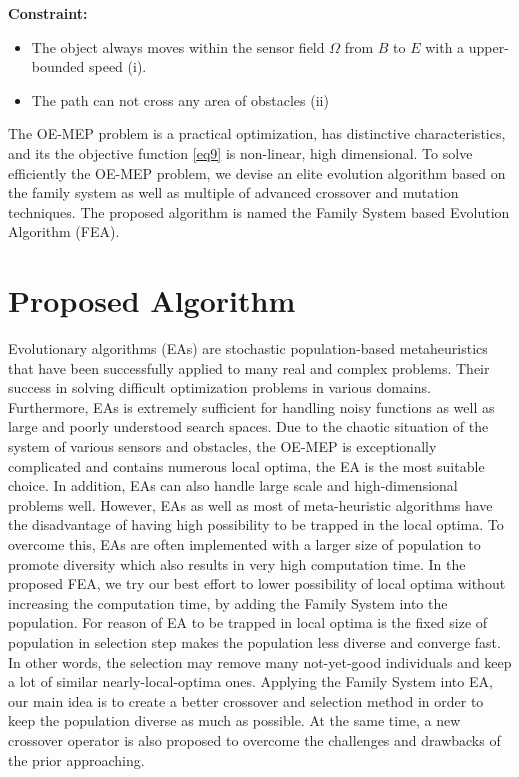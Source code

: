 \documentclass[final]{elsarticle}
\begin{document}
\textbf{Constraint:}	
\begin{itemize}
	\item The object always moves within the sensor field $\Omega $ from $B$ to $E$ with a upper-bounded speed (i).
	\item The path can not cross any area of obstacles  (ii)
\end{itemize}
	
The OE-MEP problem is a practical optimization, has distinctive characteristics, and its the objective function \eqref{eq9} is non-linear, high dimensional. To solve efficiently the OE-MEP problem, we devise an elite evolution algorithm based on the family system as well as multiple of advanced crossover and mutation techniques. The proposed algorithm is named the Family System based Evolution Algorithm (FEA).

\section{Proposed Algorithm}
Evolutionary algorithms (EAs) are stochastic population-based metaheuristics that have been successfully applied to many real and complex problems. Their success in solving difficult optimization problems in various domains. Furthermore, EAs is extremely sufficient for handling noisy functions as well as large and poorly understood search spaces. Due to the chaotic situation of the system of various sensors and obstacles, the OE-MEP is exceptionally complicated and contains numerous local optima, the EA is the most suitable choice. In addition, EAs can also handle large scale and high-dimensional problems well. However, EAs as well as most of meta-heuristic algorithms have the disadvantage of having high possibility to be trapped in the local optima. To overcome this, EAs are often implemented with a larger size of population to promote diversity which also results in very high computation time. In the proposed FEA, we try our best effort to lower possibility of local optima without increasing the computation time, by adding the Family System into the population. For reason of EA to be trapped in local optima is the fixed size of population in selection step makes the population less diverse and converge fast. In other words, the selection may remove many not-yet-good individuals and keep a lot of similar nearly-local-optima ones. Applying the Family System into EA, our main idea is to create a better crossover and selection method in order to keep the population diverse as much as possible. At the same time, a new crossover operator is also proposed to overcome the challenges and drawbacks of the prior approaching.
\end{document}

